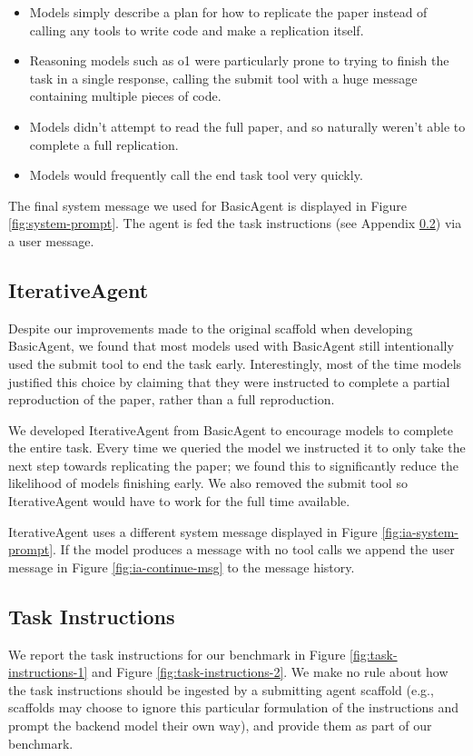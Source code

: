 \documentclass{article}
\theoremstyle{plain}
\theoremstyle{definition}
\theoremstyle{remark}
\begin{document}
\begin{itemize}
    \item Models simply describe a plan for how to replicate the paper instead of calling any tools to write code and make a replication itself.
    \item Reasoning models such as o1 were particularly prone to trying to finish the task in a single response, calling the submit tool with a huge message containing multiple pieces of code. 
    \item Models didn't attempt to read the full paper, and so naturally weren't able to complete a full replication.
    \item Models would frequently call the end task tool very quickly.
\end{itemize}

The final system message we used for BasicAgent is displayed in Figure \ref{fig:system-prompt}. The agent is fed the task instructions (see Appendix \ref{app:task-instructions}) via a user message. 

\subsection{IterativeAgent}
\label{app:iterative-agent}

Despite our improvements made to the original scaffold when developing BasicAgent, we found that most models used with BasicAgent still intentionally used the submit tool to end the task early. Interestingly, most of the time models justified this choice by claiming that they were instructed to complete a partial reproduction of the paper, rather than a full reproduction.

We developed IterativeAgent from BasicAgent to encourage models to complete the entire task. Every time we queried the model we instructed it to only take the next step towards replicating the paper; we found this to significantly reduce the likelihood of models finishing early. We also removed the submit tool so IterativeAgent would have to work for the full time available.

IterativeAgent uses a different system message displayed in Figure \ref{fig:ia-system-prompt}. If the model produces a message with no tool calls we append the user message in Figure \ref{fig:ia-continue-msg} to the message history.

\subsection{Task Instructions}\label{app:task-instructions}
We report the task instructions for our benchmark in Figure \ref{fig:task-instructions-1} and Figure \ref{fig:task-instructions-2}. We make no rule about how the task instructions should be ingested by a submitting agent scaffold (e.g., scaffolds may choose to ignore this particular formulation of the instructions and prompt the backend model their own way), and provide them as part of our benchmark.
\end{document}
